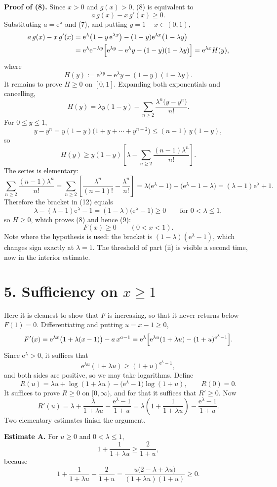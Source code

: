 \documentclass[12pt]{article}
\newcommand{\e}{\mathrm{e}}
\newcommand{\LL}{\lambda}
\begin{document}
\textbf{Proof of (8).} Since \(x>0\) and \(g(x)>0\), (8) is equivalent to
\[
a\,g(x)-x\,g'(x)\ge0 .
\]
Substituting \(a=\e^{\LL}\) and (7), and putting \(y=1-x\in(0,1)\),
\[
\begin{aligned}
a\,g(x)-x\,g'(x)
&=\e^{\LL}\bigl(1-y\,\e^{\LL x}\bigr)-(1-y)\e^{\LL x}\bigl(1-\LL y\bigr)\\
&=\e^{\LL}\e^{-\LL y}\Bigl[\e^{\LL y}-\e^{\LL}y-(1-y)(1-\LL y)\Bigr]
=\e^{\LL x}H(y),
\end{aligned}
\]
where
\[
H(y):=\e^{\LL y}-\e^{\LL}y-(1-y)(1-\LL y).
\tag{10}
\]
It remains to prove \(H\ge0\) on \([0,1]\). Expanding both exponentials
and cancelling,
\[
H(y)=\LL y(1-y)-\sum_{n\ge2}\frac{\LL^n\bigl(y-y^n\bigr)}{n!} .
\tag{11}
\]
For \(0\le y\le1\),
\[
y-y^n=y(1-y)\bigl(1+y+\cdots+y^{n-2}\bigr)\le(n-1)\,y(1-y),
\]
so
\[
H(y)\ge y(1-y)\left[\LL-\sum_{n\ge2}\frac{(n-1)\LL^n}{n!}\right].
\tag{12}
\]
The series is elementary:
\[
\sum_{n\ge2}\frac{(n-1)\LL^n}{n!}
=\sum_{n\ge2}\left[\frac{\LL^n}{(n-1)!}-\frac{\LL^n}{n!}\right]
=\LL\bigl(\e^{\LL}-1\bigr)-\bigl(\e^{\LL}-1-\LL\bigr)
=(\LL-1)\e^{\LL}+1 .
\]
Therefore the bracket in (12) equals
\[
\LL-(\LL-1)\e^{\LL}-1=(1-\LL)\bigl(\e^{\LL}-1\bigr)\ge0
\qquad\text{for }0<\LL\le1,
\]
so \(H\ge0\), which proves (8) and hence (9):
\[
\boxed{F(x)\ge0\qquad(0<x<1).}
\]
Note where the hypothesis is used: the bracket is \((1-\LL)(\e^{\LL}-1)\),
which changes sign exactly at \(\LL=1\). The threshold of part (ii) is
visible a second time, now in the interior estimate.

\section*{5. Sufficiency on \(x\ge1\)}

Here it is cleanest to show that \(F\) is increasing, so that it never
returns below \(F(1)=0\). Differentiating and putting \(u=x-1\ge0\),
\[
F'(x)=\e^{\LL x}\bigl(1+\LL(x-1)\bigr)-a\,x^{a-1}
=\e^{\LL}\Bigl[\e^{\LL u}(1+\LL u)-(1+u)^{\e^{\LL}-1}\Bigr].
\]
Since \(\e^{\LL}>0\), it suffices that
\[
\e^{\LL u}(1+\LL u)\ge(1+u)^{\e^{\LL}-1},
\]
and both sides are positive, so we may take logarithms. Define
\[
R(u)=\LL u+\log(1+\LL u)-\bigl(\e^{\LL}-1\bigr)\log(1+u),
\qquad R(0)=0 .
\]
It suffices to prove \(R\ge0\) on \([0,\infty)\), and for that it suffices
that \(R'\ge0\). Now
\[
R'(u)=\LL+\frac{\LL}{1+\LL u}-\frac{\e^{\LL}-1}{1+u}
=\LL\left(1+\frac1{1+\LL u}\right)-\frac{\e^{\LL}-1}{1+u}.
\tag{13}
\]
Two elementary estimates finish the argument.

\textbf{Estimate A.} For \(u\ge0\) and \(0<\LL\le1\),
\[
1+\frac1{1+\LL u}\ge\frac2{1+u},
\]
because
\[
1+\frac1{1+\LL u}-\frac2{1+u}
=\frac{u\bigl(2-\LL+\LL u\bigr)}{(1+\LL u)(1+u)}\ge0 .
\]
\end{document}

